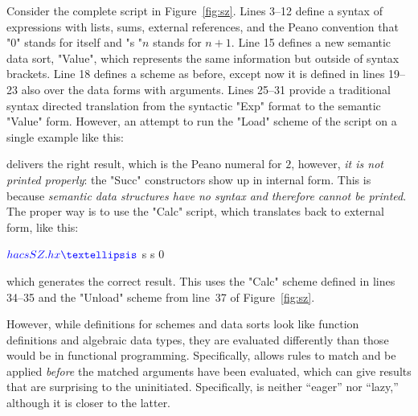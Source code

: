 \documentclass[11pt]{article} %
\begin{document}
\begin{example}
  Consider the complete \HAX script in Figure~\ref{fig:sz}. Lines 3--12 define a syntax of
  expressions with lists, sums, external references, and the Peano convention that "0" stands for
  itself and "s "$n$ stands for $n+1$. Line 15 defines a new semantic data sort, "Value", which
  represents the same information but outside of syntax brackets. Line 18 defines a scheme as
  before, except now it is defined in lines 19--23 also over the data forms with arguments. Lines
  25--31 provide a traditional syntax directed translation from the syntactic "Exp" format to the
  semantic "Value" form. However, an attempt to run the "Load" scheme of the script on a single
  example like this:
  delivers the right result, which is the Peano numeral for $2$,
  however, \emph{it is not printed properly}: the "Succ" constructors show up in internal form. This
  is because \emph{semantic data structures have no syntax and therefore cannot be printed}. The
  proper way is to use the "Calc" script, which translates back to external form, like this:
  \begin{code}[commandchars=\\\{\}]
$ 
…
$ 
 s  s  0   
  \end{code}
  which generates the correct result. This uses the "Calc" scheme defined in lines 34--35 and the
  "Unload" scheme from line~37 of Figure~\ref{fig:sz}.
\end{example}

However, while \HAX definitions for schemes and data sorts look like function definitions and
algebraic data types, they are evaluated differently than those would be in functional programming.
Specifically, \HAX allows rules to match and be applied \emph{before} the matched arguments have
been evaluated, which can give results that are surprising to the uninitiated. Specifically, \HAX is
neither ``eager'' nor ``lazy,'' although it is closer to the latter.
\end{document}
